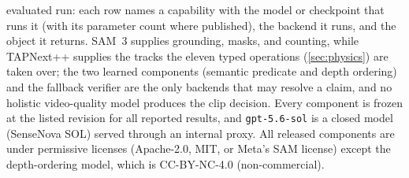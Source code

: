 \begin{table}[t]
{evaluated run: each row names a capability with the model or checkpoint that runs it (with
its parameter count where published), the backend it runs, and the object it returns.
SAM~3 supplies grounding, masks, and counting, while TAPNext++ supplies the tracks the
eleven typed operations (\cref{sec:physics}) are taken over; the two learned components
(semantic predicate and depth ordering) and the fallback verifier are the only backends
that may resolve a claim, and no holistic video-quality model produces the clip decision.
Every component is frozen at the listed revision for all reported results, and
\texttt{gpt-5.6-sol} is a closed model (SenseNova SOL) served through an internal proxy.
All released components are under permissive licenses (Apache-2.0, MIT, or Meta's SAM
license) except the depth-ordering model, which is CC-BY-NC-4.0 (non-commercial).}
\label{tab:specialists}
\end{table}
